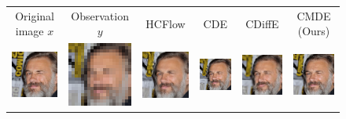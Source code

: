 \begin{figure}[ht]
    \begin{center}
      \begingroup
      \setlength{\tabcolsep}{4pt} %
      \begin{tabular}{cccccc}
        \small Original image $x$ & \small Observation $y$ & \small HCFlow & \small CDE & \small CDiffE & \small CMDE (Ours) \\
        
        \includegraphics[width=.15\textwidth]{Chapter2/samples/super-resolution/table/1/x.png} &   
        \includegraphics[width=.15\textwidth]{Chapter2/samples/super-resolution/table/1/y.png} &
        \includegraphics[width=.15\textwidth]{Chapter2/samples/super-resolution/table/1/hcflow.png} &
        \includegraphics[width=.15\textwidth]{Chapter2/samples/super-resolution/table/1/sr3.png} & 
        \includegraphics[width=.15\textwidth]{Chapter2/samples/super-resolution/table/1/Song.png} &
        \includegraphics[width=.15\textwidth]{Chapter2/samples/super-resolution/table/1/DV.png} \\
        

\end{tabular}
\end{center}
\end{figure}
